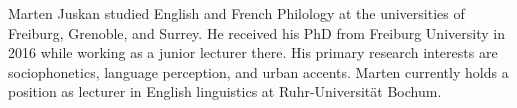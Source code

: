 Marten Juskan studied English and French Philology at the universities of Freiburg, Grenoble, and Surrey.
He received his PhD from Freiburg University in 2016 while working as a junior lecturer there.
His primary research interests are sociophonetics, language perception, and urban accents.
Marten currently holds a position as lecturer in English linguistics at Ruhr-Universität Bochum.